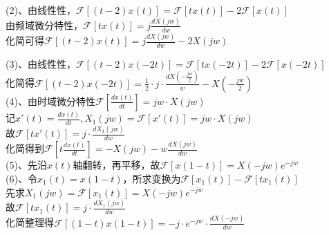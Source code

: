 \documentclass[answers]{exam}  %
\begin{document}
\begin{questions}
\begin{solution}
	(2)、由线性性，$\mathcal{F}[(t-2)x(t)]=\mathcal{F}[tx(t)]-2\mathcal{F}[x(t)]$\\
	由频域微分特性，$\mathcal{F}[tx(t)]=j\frac{dX(jw)}{dw}$\\
	化简可得$\mathcal{F}[(t-2)x(t)]=j\frac{dX(jw)}{dw}-2X(jw)$

	(3)、由线性性，$\mathcal{F}[(t-2)x(-2t)]=\mathcal{F}[tx(-2t)]-2\mathcal{F}[x(-2t)]$\\
	化简得$\mathcal{F}[(t-2)x(-2t)]=\frac{1}{2}\cdot j\cdot\frac{dX(-\frac{jw}{2})}{w}-X(-\frac{jw}{2})$\\
	
	(4)、由时域微分特性$\mathcal{F}[\frac{dx(t)}{dt}]=jw\cdot X(jw)$\\
	记$x'(t)=\frac{dx(t)}{dt},X_1(jw)=\mathcal{F}[x'(t)]=jw\cdot X(jw)$\\
	故$\mathcal{F}[tx'(t)]=j\cdot\frac{dX_1(jw)}{dw}$\\
	化简得到$\mathcal{F}[t\frac{dx(t)}{dt}]=-X(jw)-w\frac{dX(jw)}{dw}$\\

	(5)、先沿$x(t)$轴翻转，再平移，故$\mathcal{F}[x(1-t)]=X(-jw)e^{-jw}$\\

	(6)、令$x_1(t)=x(1-t)$，所求变换为$\mathcal{F}[x_1(t)]-\mathcal{F}[tx_1(t)]$\\
	先求$X_1(jw)=\mathcal{F}[x_1(t)]=X(-jw)e^{-jw}$\\
	故$\mathcal{F}[tx_1(t)]=j\cdot\frac{dX_1(jw)}{dw}$\\
	化简整理得$\mathcal{F}[(1-t)x(1-t)]=-j\cdot e^{-jw}\cdot\frac{dX(-jw)}{dw}$



\end{solution}
\end{questions}
\end{document}
